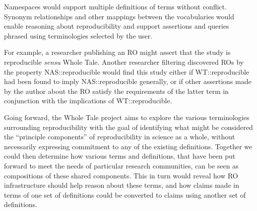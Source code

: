 Namespaces would support multiple definitions of terms without conflict.
Synonym relationships and other mappings between the vocabularies would enable reasoning about reproducibility
	 and support assertions and queries phrased using terminologies selected by the user.

For example, a researcher publishing an RO might assert that the study is reproducible \emph{sensu} \textsf{Whole Tale}.  Another researcher filtering discovered ROs by the property \textsf{NAS::reproducible} would find this study
    either if \textsf{WT::reproducible} had been found to imply \textsf{NAS::reproducible} generally, or if other assertions made by the author
    about the RO satisfy the requirements of the latter term in conjunction with the implications of \textsf{WT::reproducible}.

Going forward, the Whole Tale project aims to explore the various terminologies
    surrounding reproducibility with the goal of identifying what might be considered
    the ``principle components'' of reproducibility in science as a whole, without
    necessarily expressing commitment to any of the existing definitions.
Together we could then determine how various terms and definitions,
that have been put forward to meet the needs of particular research communities, can be seen as
    compositions of these shared components.
This in turn would reveal how RO infrastructure should help reason about these terms,
	and how claims made in terms of one set of definitions could be converted to claims using
    another set of definitions.


